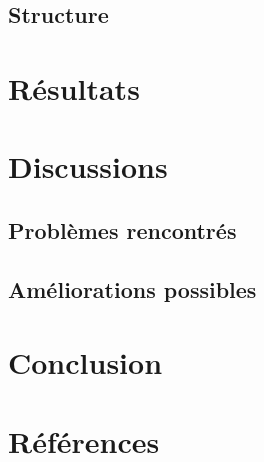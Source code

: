\documentclass[a4paper]{article}
\begin{document}

\subsection{Structure}

\newpage

\section{Résultats}

\newpage

\section{Discussions}
\subsection{Problèmes rencontrés}


\subsection{Améliorations possibles}

\newpage

\section{Conclusion}

\newpage

\section{Références}
\nocite{*}


\end{document}
